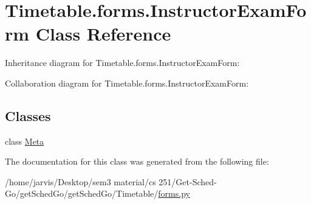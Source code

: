 \hypertarget{classTimetable_1_1forms_1_1InstructorExamForm}{}\section{Timetable.\+forms.\+Instructor\+Exam\+Form Class Reference}
\label{classTimetable_1_1forms_1_1InstructorExamForm}


Inheritance diagram for Timetable.\+forms.\+Instructor\+Exam\+Form\+:


Collaboration diagram for Timetable.\+forms.\+Instructor\+Exam\+Form\+:
\subsection*{Classes}
\begin{DoxyCompactItemize}
\item 
class \hyperlink{classTimetable_1_1forms_1_1InstructorExamForm_1_1Meta}{Meta}
\end{DoxyCompactItemize}


The documentation for this class was generated from the following file\+:\begin{DoxyCompactItemize}
\item 
/home/jarvis/\+Desktop/sem3 material/cs 251/\+Get-\/\+Sched-\/\+Go/get\+Sched\+Go/get\+Sched\+Go/\+Timetable/\hyperlink{Timetable_2forms_8py}{forms.\+py}\end{DoxyCompactItemize}
